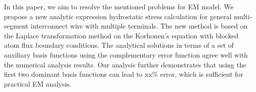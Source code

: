 




In this paper, we aim to resolve the mentioned problems for EM
model. We propose a new analytic expression hydrostatic stress
calculation for general multi-segment interconnect wire with multiple
terminals. The new method is based on the Laplace transformation
method on the Korhonen's equation with blocked atom flux boundary
conditions. The analytical solutions in terms of a set of auxiliary
basis functions using the complementary error function agree well with
the numerical analysis results. Our analysis further demonstrates that
using the first two dominant basis functions can lead to xx\% error,
which is sufficient for practical EM analysis.

